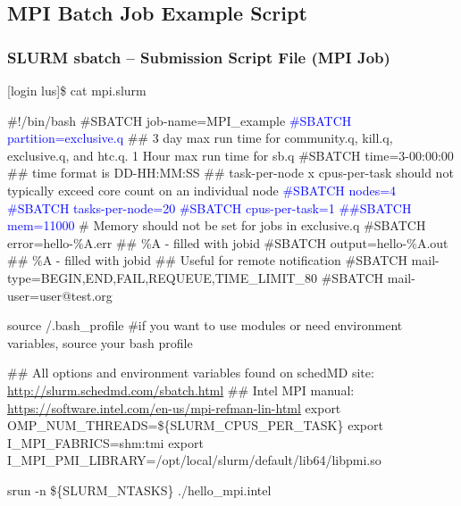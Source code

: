 \subsection{MPI Batch Job Example Script}
\begin{frame}[fragile]
\frametitle{SLURM sbatch -- Submission Script File (MPI Job)}
\begin{semiverbatim}\tiny
[login lus]\$ cat mpi.slurm

\#!/bin/bash
\#SBATCH \ddash{}job-name=MPI\_example
\textcolor{blue}{\#SBATCH \ddash{}partition=exclusive.q}
\#\# 3 day max run time for community.q, kill.q, exclusive.q, and htc.q.  1 Hour max run time for sb.q
\#SBATCH \ddash{}time=3-00:00:00 ## time format is DD-HH:MM:SS
\#\# task-per-node x cpus-per-task should not typically exceed core count on an individual node 
\textcolor{blue}{\#SBATCH \ddash{}nodes=4}
\textcolor{blue}{\#SBATCH \ddash{}tasks-per-node=20}
\textcolor{blue}{\#SBATCH \ddash{}cpus-per-task=1}
\textcolor{blue}{\#\#SBATCH \ddash{}mem=11000} \# Memory should not be set for jobs in exclusive.q
\#SBATCH \ddash{}error=hello-\%A.err \#\# \%A - filled with jobid
\#SBATCH \ddash{}output=hello-\%A.out \#\# \%A - filled with jobid
\#\# Useful for remote notification
\#SBATCH \ddash{}mail-type=BEGIN,END,FAIL,REQUEUE,TIME\_LIMIT\_80
\#SBATCH \ddash{}mail-user=user@test.org

source \ctilde/.bash_profile \#if you want to use modules or need environment variables, source your bash profile

\#\# All options and environment variables found on schedMD site: \href{http://slurm.schedmd.com/sbatch.html}{http://slurm.schedmd.com/sbatch.html}
\#\# Intel MPI manual: \href{https://software.intel.com/en-us/mpi-refman-lin-html}{https://software.intel.com/en-us/mpi-refman-lin-html}
export OMP\_NUM\_THREADS=\$\{SLURM\_CPUS\_PER\_TASK\}
export I\_MPI\_FABRICS=shm:tmi  
export I\_MPI\_PMI\_LIBRARY=/opt/local/slurm/default/lib64/libpmi.so

srun  -n \$\{SLURM\_NTASKS\}  ./hello\_mpi.intel 
\end{semiverbatim}
\end{frame}



